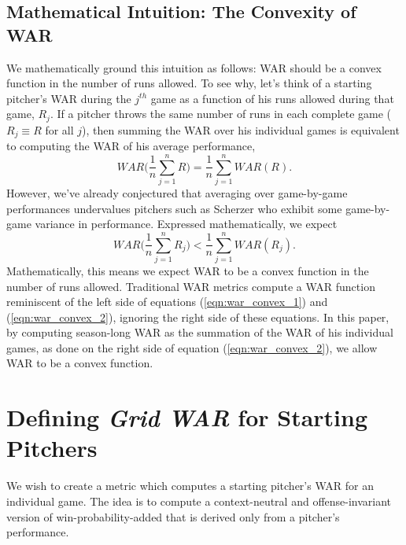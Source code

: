 \documentclass[12pt]{article}
\begin{document}
\subsection{Mathematical Intuition: The Convexity of WAR}

We mathematically ground this intuition as follows: WAR should be a convex function in the number of runs allowed. To see why, let's think of a starting pitcher's WAR during the $j^{th}$ game as a function of his runs allowed during that game, $R_j$. If a pitcher throws the same number of runs in each complete game ($R_j \equiv R$ for all $j$), then summing the WAR over his individual games is equivalent to computing the WAR of his average performance,
\begin{equation}
WAR\bigg( \frac{1}{n} \sum_{j=1}^{n}  R \bigg) = \frac{1}{n} \sum_{j=1}^{n} WAR(R).
\label{eqn:war_convex_1}
\end{equation}
However, we've already conjectured that averaging over game-by-game performances undervalues pitchers such as Scherzer who exhibit some game-by-game variance in performance. Expressed mathematically, we expect
\begin{equation}
WAR\bigg( \frac{1}{n} \sum_{j=1}^{n}  R_j \bigg) < \frac{1}{n} \sum_{j=1}^{n} WAR(R_j).
\label{eqn:war_convex_2}
\end{equation}
Mathematically, this means we expect WAR to be a convex function in the number of runs allowed. Traditional WAR metrics compute a WAR function reminiscent of the left side of equations (\ref{eqn:war_convex_1}) and (\ref{eqn:war_convex_2}), ignoring the right side of these equations. In this paper, by computing season-long WAR as the summation of the WAR of his individual games, as done on the right side of equation (\ref{eqn:war_convex_2}), we allow WAR to be a convex function.




\section{Defining \textit{Grid WAR} for Starting Pitchers}

We wish to create a metric which computes a starting pitcher's WAR for an individual game. The idea is to compute a context-neutral and offense-invariant version of win-probability-added that is derived only from a pitcher's performance. 
\end{document}
